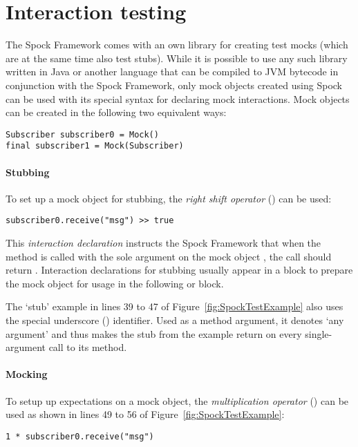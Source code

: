 \section{Interaction testing}
The Spock Framework comes with an own library
for creating test mocks
(which are at the same time also test stubs).
While it is possible to use any such library
written in Java or another language
that can be compiled to JVM bytecode
in conjunction with the Spock Framework,
only mock objects created using Spock
can be used with its special syntax
for declaring mock interactions.
Mock objects can be created in the following two equivalent ways:
\autocite[Chapter: Interaction Based Testing - Creating Mock Objects]{SpockFrameworkDoc}
\begin{verbatim}
Subscriber subscriber0 = Mock()
final subscriber1 = Mock(Subscriber)
\end{verbatim}

\paragraph{Stubbing}
To set up a mock object for stubbing,
the \textit{right shift operator} (\code{>>}) can be used:
\begin{verbatim}
subscriber0.receive("msg") >> true
\end{verbatim}

This \textit{interaction declaration} instructs the Spock Framework that when
the method  is called with
the sole argument  on
the mock object ,
the call should return .
Interaction declarations for stubbing usually appear in a  block
to prepare the mock object for usage in the following  or  block.

The `stub' example
in lines 39 to 47 of Figure~\ref{fig:SpockTestExample}
also uses the special underscore (\code{_}) identifier.
Used as a method argument, it denotes `any argument'
and thus makes the stub from the example return 
on every single-argument call to its  method.

\paragraph{Mocking}
To setup up expectations on a mock object,
the \textit{multiplication operator} (\code{*}) can be used as shown
in lines 49 to 56 of Figure~\ref{fig:SpockTestExample}:
\begin{verbatim}
1 * subscriber0.receive("msg")
\end{verbatim}

